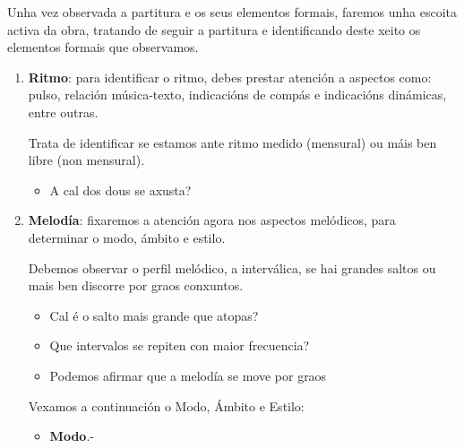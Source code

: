 Unha vez observada a partitura e os seus elementos formais, faremos unha escoita activa da obra, tratando de seguir a partitura e identificando deste xeito os elementos formais que observamos. 
%
%
    \begin{enumerate}[1.-]
        \item %
        \textbf{Ritmo}: para identificar o ritmo, debes prestar atención a aspectos como:
        pulso, relación música-texto, indicacións de compás e indicacións dinámicas, entre outras.
        \par
        Trata de identificar se estamos ante ritmo medido (mensural) ou máis ben libre (non mensural). 
        \begin{itemize}
            \item A cal dos dous se axusta? \dotfill
        \end{itemize}
        \item %
        \textbf{Melodía}: fixaremos a atención agora nos aspectos melódicos, para determinar o modo, ámbito e estilo. \par
        Debemos observar o perfil melódico, a interválica, se hai grandes saltos ou mais ben discorre por graos conxuntos.
        \begin{itemize}
            \item 
            Cal é o salto mais grande que atopas? \dotfill
            \item 
            Que intervalos se repiten con maior frecuencia? \dotfill
            \item
            Podemos afirmar que a melodía se move por graos \dotfill
        \end{itemize}
        Vexamos a continuación o Modo, Ámbito e Estilo:
        \begin{itemize}
            \item %
            \textbf{Modo}.- 
        \begin{itemize}
\end{itemize}
\end{itemize}
\end{enumerate}
